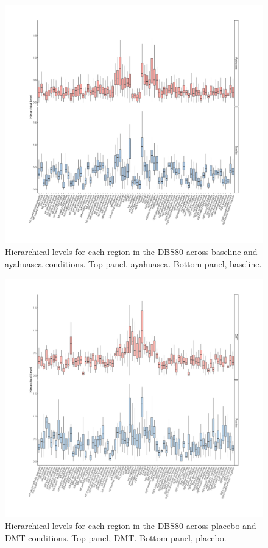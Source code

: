 \begin{figure}[h!]
    \centering
    \includegraphics[width=\textwidth]{images/Appendix_ AYA HL.png}
    \caption[Regional hierarchical levels under baseline and ayahuasca.]{Hierarchical levels for each region in the DBS80 across baseline and ayahuasca conditions. Top panel, ayahuasca. Bottom panel, baseline.}
    \label{fig:ayahl}
\end{figure}

\begin{figure}[h!]
    \centering
    \includegraphics[width=\textwidth]{images/Appendix_ DMT HL.png}
    \caption[Hierarchical levels under placebo and DMT.]{Hierarchical levels for each region in the DBS80 across placebo and DMT conditions. Top panel, DMT. Bottom panel, placebo.}
    \label{fig:dmthl}
\end{figure}

